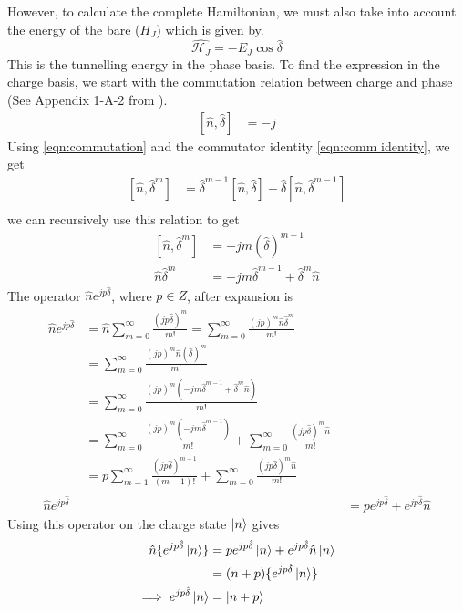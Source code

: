 However, to calculate the complete Hamiltonian, we must also take into account the energy of the bare \JJ ($H_J$) which is given by.
\begin{equation}
\hat{\mathcal{H}_J}=-E_J\cos\hat{\delta}
\end{equation}
This is the tunnelling energy in the phase basis. To find the expression in the charge basis, we start with the commutation relation between charge and phase (See Appendix 1-A-2 from \cite{Cottet2002d}).
\begin{align}
\left[\hat{n},\hat{\delta}\right]&=-j
\label{eqn:commutation}
\end{align}
Using \ref{eqn:commutation} and the commutator identity \ref{eqn:comm identity}, we get
\begin{align}
\left[\hat{n},\hat{\delta}^m\right]&=\hat{\delta}^{m-1}\left[\hat{n},\hat{\delta}\right]+\hat{\delta}\left[\hat{n},\hat{\delta}^{m-1}\right]
\label{eqn:comm identity}\\
\end{align}
we can recursively use this relation to get
\begin{align}
\left[\hat{n},\hat{\delta}^m\right]&=-jm(\hat{\delta})^{m-1}\\
\hat{n}\hat{\delta}^m&=-jm\hat{\delta}^{m-1}+\hat{\delta}^m\hat{n}
\end{align}
The operator $\hat{n}e^{jp\hat{\delta}}$, where $p\in Z$, after expansion is
\begin{align}
\begin{split}
\hat{n}e^{jp\hat{\delta}}&=\hat{n}\sum_{m=0}^\infty \frac{( jp\hat{\delta})^m}{m!}=\sum_{m=0}^\infty \frac{(jp)^m\hat{n}\hat{\delta}^m}{m!}\\
&=\sum_{m=0}^\infty \frac{(jp)^m\hat{n}(\hat{\delta})^m}{m!}\\
&=\sum_{m=0}^\infty \frac{(jp)^m(-jm\hat{\delta}^{m-1}+\hat{\delta}^m\hat{n})}{m!}\\
&=\sum_{m=0}^\infty \frac{(jp)^m(-jm\hat{\delta}^{m-1})}{m!}+\sum_{m=0}^\infty \frac{(jp\hat{\delta})^m\hat{n}}{m!}\\
&=p\sum_{m=1}^\infty \frac{(jp\hat{\delta})^{m-1}}{(m-1)!}+\sum_{m=0}^\infty \frac{(jp\hat{\delta})^m\hat{n}}{m!}
\end{split}\\
\hat{n}e^{jp\hat{\delta}}&=pe^{jp\hat{\delta}}+e^{jp\hat{\delta}}\hat{n}
\end{align}
Using this operator on the charge state $\ket{n}$ gives
\begin{align}
\hat{n}\lbrace e^{jp\hat{\delta}}\ket{n}\rbrace&=pe^{jp\hat{\delta}}\ket{n}+e^{jp\hat{\delta}}\hat{n}\ket{n}\\
&=(n+p)\lbrace e^{jp\hat{\delta}}\ket{n}\rbrace\\
\implies e^{jp\hat{\delta}}\ket{n}&=\ket{n+p}
\end{align}
